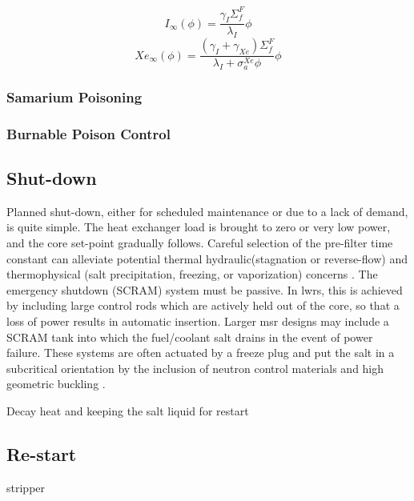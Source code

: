  
\begin{equation}\label{eqn:eqI}
    I_{\infty}(\phi) = \frac{\gamma_I \Sigma_f^F }{\lambda_I}\phi
\end{equation}
\begin{equation}\label{eqn:eqXe}
    Xe_{\infty}(\phi) = \frac{(\gamma_I+\gamma_{Xe}) \Sigma_f^F }{\lambda_I+\sigma_a^{Xe}\phi}\phi
\end{equation}

\subsubsection{Samarium Poisoning}


\subsubsection{Burnable Poison Control}


\subsection{Shut-down}
Planned shut-down, either for scheduled maintenance or due to a lack of demand, is quite simple. The heat exchanger load is brought to zero or very low power, and the core set-point gradually follows. Careful selection of the pre-filter time constant can alleviate potential thermal hydraulic(\eg stagnation or reverse-flow) and thermophysical (\eg salt precipitation, freezing, or vaporization) concerns \cite{CarterNumerical}. The emergency shutdown (\ie SCRAM) system must be passive. In \acsp{lwr}, this is achieved by including large control rods which are actively held out of the core, so that a loss of power results in automatic insertion. Larger \acs{msr} designs may include a SCRAM tank into which the fuel/coolant salt drains in the event of power failure. These systems are often actuated by a freeze plug \cite{FreezePlug} and put the salt in a subcritical orientation by the inclusion of neutron control materials \cite[Ch. 1]{Charit} and high geometric buckling \cite[Ch. 6]{Lamarsh}.

Decay heat and keeping the salt liquid for restart

\subsection{Re-start}
\Xe stripper


